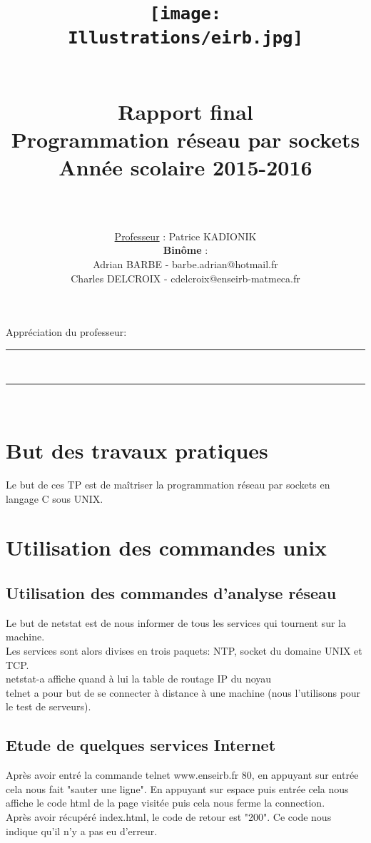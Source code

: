 \documentclass[paper=a4, fontsize=12pt]{article}
\title{
\begin{figure}[H]
\centering
\texttt{[image: Illustrations/eirb.jpg]}
\end{figure}
  \usefont{OT1}{bch}{b}{n}
  \horrule{1.5pt} \\[0.5cm]	
  \Huge \textbf{Rapport final} \\ [10pt]
  \Huge Programmation réseau par sockets \\ [15pt]
  \LARGE Année scolaire 2015-2016 \\ 
  \horrule{1.5pt} \\[0.5cm]
}
\author{
  \huge \underline{Professeur} : \LARGE Patrice KADIONIK\\[20pt]
  \normalfont 							
  \huge \textbf{Binôme} :\\[10pt]
\Large Adrian BARBE - barbe.adrian@hotmail.fr\\[5pt]
 \Large Charles DELCROIX - cdelcroix@enseirb-matmeca.fr \\[5pt]
  \normalsize
}
\date{}
\numberwithin{equation}{section}		%
\numberwithin{figure}{section}			%
\numberwithin{table}{section}				%
\newcommand{\horrule}[1]{\rule{\linewidth}{#1}} 	%
\begin{document}
\maketitle
\newpage
 \Large Appréciation du professeur:\\
 \vspace{10\baselineskip}
  \horrule{1.5pt} \\[0.5cm]
\horrule{1.5pt} \\[0.5cm]
\normalsize
\tableofcontents

\newpage
\section{But des travaux pratiques}
Le but de ces TP est de maîtriser la programmation réseau par sockets en langage C sous UNIX.
\section{Utilisation des commandes unix}
\subsection{Utilisation des commandes d'analyse réseau}
Le but de netstat est de nous informer de tous les services qui tournent sur la machine.\\
Les services sont alors divises en trois paquets: NTP, socket du domaine UNIX et TCP.\\
netstat-a affiche quand à lui la table de routage IP du noyau
\\telnet a pour but de se connecter à distance à une machine (nous l'utilisons pour le test de serveurs).
\subsection{Etude de quelques services Internet}
Après avoir entré la commande telnet www.enseirb.fr 80, en appuyant sur entrée cela nous fait "sauter une ligne". En appuyant sur espace puis entrée cela nous affiche le code html de la page visitée puis cela nous ferme la connection.
\\Après avoir récupéré index.html, le code de retour est "200". Ce code nous indique qu'il n'y a pas eu d'erreur.
\end{document}
